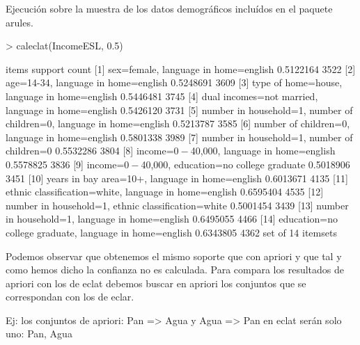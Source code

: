 \documentclass [a4paper] {article}
\begin{document}
Ejecución sobre la muestra de los datos demográficos incluídos en el paquete arules.
\begin{Schunk}
\begin{Sinput}
> caleclat(IncomeESL, 0.5)
\end{Sinput}
\begin{Soutput}
     items                             support count
[1]  {sex=female,                                   
      language in home=english}      0.5122164  3522
[2]  {age=14-34,                                    
      language in home=english}      0.5248691  3609
[3]  {type of home=house,                           
      language in home=english}      0.5446481  3745
[4]  {dual incomes=not married,                     
      language in home=english}      0.5426120  3731
[5]  {number in household=1,                        
      number of children=0,                         
      language in home=english}      0.5213787  3585
[6]  {number of children=0,                         
      language in home=english}      0.5801338  3989
[7]  {number in household=1,                        
      number of children=0}          0.5532286  3804
[8]  {income=$0-$40,000,                            
      language in home=english}      0.5578825  3836
[9]  {income=$0-$40,000,                            
      education=no college graduate} 0.5018906  3451
[10] {years in bay area=10+,                        
      language in home=english}      0.6013671  4135
[11] {ethnic classification=white,                  
      language in home=english}      0.6595404  4535
[12] {number in household=1,                        
      ethnic classification=white}   0.5001454  3439
[13] {number in household=1,                        
      language in home=english}      0.6495055  4466
[14] {education=no college graduate,                
      language in home=english}      0.6343805  4362
set of 14 itemsets 
\end{Soutput}
\end{Schunk}

Podemos observar que obtenemos el mismo soporte que con apriori y que tal y como hemos dicho la confianza no es calculada.
Para compara los resultados de apriori con los de eclat debemos buscar en apriori los conjuntos que se correspondan con los de eclar.

Ej: los conjuntos de apriori: {Pan} => {Agua} y {Agua} => {Pan} en eclat serán solo uno: {Pan, Agua}
\end{document}
